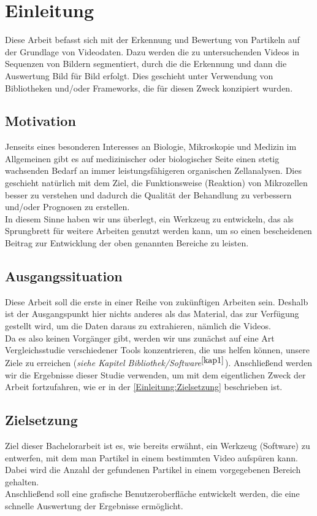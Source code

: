 \chapter{Einleitung \label{Einleitung}}
Diese Arbeit befasst sich mit der Erkennung und Bewertung von Partikeln auf der Grundlage von Videodaten. Dazu werden die zu untersuchenden Videos in Sequenzen von Bildern segmentiert, durch die die Erkennung und dann die Auswertung Bild für Bild erfolgt. Dies geschieht unter Verwendung von Bibliotheken und/oder Frameworks, die für diesen Zweck konzipiert wurden.

\section{Motivation \label{Einleitung:Motivation}}
Jenseits eines besonderen Interesses an Biologie, Mikroskopie und Medizin im Allgemeinen gibt es auf medizinischer oder biologischer Seite einen stetig wachsenden Bedarf an immer leistungsfähigeren organischen Zellanalysen. Dies geschieht natürlich mit dem Ziel, die Funktionsweise (Reaktion) von Mikrozellen besser zu verstehen und dadurch die Qualität der Behandlung zu verbessern und/oder Prognosen zu erstellen.\\
In diesem Sinne haben wir uns überlegt, ein Werkzeug zu entwickeln, das als Sprungbrett für weitere Arbeiten genutzt werden kann, um so einen bescheidenen Beitrag zur Entwicklung der oben genannten Bereiche zu leisten.

\section{Ausgangssituation \label{Einleitung:Ausgangssituation}}
Diese Arbeit soll die erste in einer Reihe von zukünftigen Arbeiten sein. Deshalb ist der Ausgangspunkt hier nichts anderes als das Material, das zur Verfügung gestellt wird, um die Daten daraus zu extrahieren, nämlich die Videos.\\
Da es also keinen Vorgänger gibt, werden wir uns zunächst auf eine Art Vergleichsstudie verschiedener Tools konzentrieren, die uns helfen können, unsere Ziele zu erreichen (\textit{siehe Kapitel Bibliothek/Software}$^{\ref{kap1}}$). Anschließend werden wir die Ergebnisse dieser Studie verwenden, um mit dem eigentlichen Zweck der Arbeit fortzufahren, wie er in der \ref{Einleitung:Zielsetzung} beschrieben ist.

\section{Zielsetzung \label{Einleitung:Zielsetzung}}
Ziel dieser Bachelorarbeit ist es, wie bereits erwähnt, ein Werkzeug (Software) zu entwerfen, mit dem man Partikel in einem bestimmten Video aufspüren kann. Dabei wird die Anzahl der gefundenen Partikel in einem vorgegebenen Bereich gehalten.\\
Anschließend soll eine grafische Benutzeroberfläche entwickelt werden, die eine schnelle Auswertung der Ergebnisse ermöglicht.


